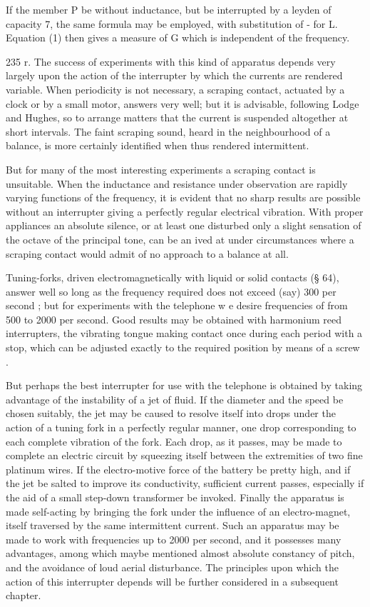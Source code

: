 If the member P be without inductance, but be interrupted by a leyden of
capacity 7, the same formula may be employed, with substitution of - for L.
Equation (1) then gives a measure of G which is independent of the frequency.

235 r. The success of experiments with this kind of apparatus depends very
largely upon the action of the interrupter by which the currents are rendered
variable. When periodicity is not
necessary, a scraping contact, actuated by a clock or by a small motor, answers
very well; but it is advisable, following Lodge and Hughes, so to arrange
matters that the current is suspended altogether at short intervals. The faint
scraping sound, heard in the neighbourhood of a balance, is more certainly
identified when thus rendered intermittent.

But for many of the most interesting experiments a scraping contact is
unsuitable. When the inductance and resistance under observation are rapidly
varying functions of the frequency, it is evident that no sharp results are
possible without an interrupter giving a perfectly regular electrical
vibration. With proper appliances an absolute silence, or at least one
disturbed only a slight sensation of the octave of the principal tone, can be
an ived at under circumstances where a scraping contact would admit of no
approach to a balance at all.

Tuning-forks, driven electromagnetically with liquid or solid contacts (§ 64),
answer well so long as the frequency required does not exceed (say) 300 per
second ; but for experiments with the telephone w e desire frequencies of from
500 to 2000 per second.  Good results may be obtained with harmonium reed
interrupters, the vibrating tongue making contact once during each period with
a stop, which can be adjusted exactly to the required position by means of a
screw .

But perhaps the best interrupter for use with the telephone is obtained by
taking advantage of the instability of a jet of fluid.  If the diameter and the
speed be chosen suitably, the jet may be caused to resolve itself into drops
under the action of a tuning fork in a perfectly regular manner, one drop
corresponding to each complete vibration of the fork. Each drop, as it passes,
may be made to complete an electric circuit by squeezing itself between the
extremities of two fine platinum wires. If the electro-motive force of the
battery be pretty high, and if the jet be salted to improve its conductivity,
sufficient current passes, especially if the aid of a small step-down
transformer be invoked.  Finally the apparatus is made self-acting by bringing
the fork under the influence of an electro-magnet, itself traversed by the same
intermittent current. Such an apparatus may be made to work with frequencies up
to 2000 per second, and it possesses many advantages, among which maybe
mentioned almost absolute
constancy of pitch, and the avoidance of loud aerial disturbance.  The
principles upon which the action of this interrupter depends will be further
considered in a subsequent chapter.

